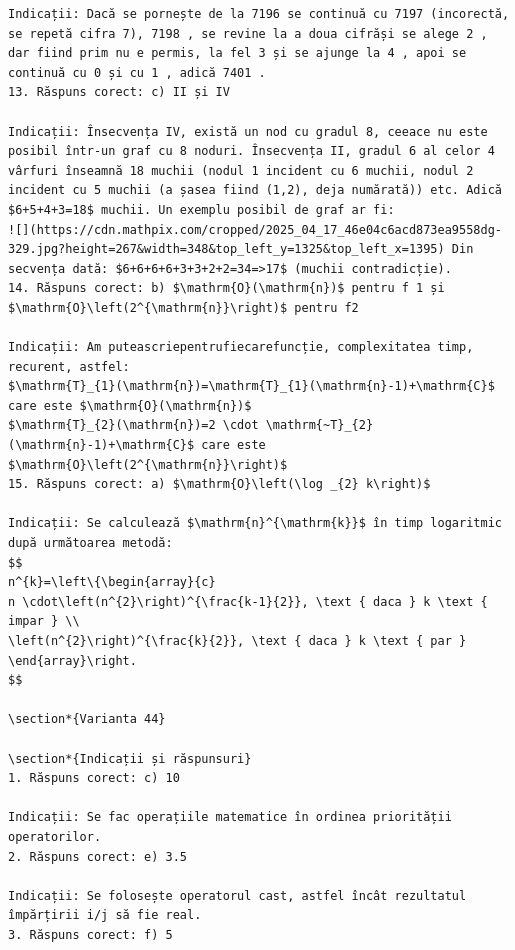 \documentclass[10pt]{article}
\begin{document}
\begin{verbatim}
Indicații: Dacă se pornește de la 7196 se continuă cu 7197 (incorectă, se repetă cifra 7), 7198 , se revine la a doua cifrăși se alege 2 , dar fiind prim nu e permis, la fel 3 și se ajunge la 4 , apoi se continuă cu 0 și cu 1 , adică 7401 .
13. Răspuns corect: c) II și IV

Indicații: Însecvența IV, există un nod cu gradul 8, ceeace nu este posibil într-un graf cu 8 noduri. Însecvența II, gradul 6 al celor 4 vârfuri înseamnă 18 muchii (nodul 1 incident cu 6 muchii, nodul 2 incident cu 5 muchii (a șasea fiind (1,2), deja numărată)) etc. Adică
$6+5+4+3=18$ muchii. Un exemplu posibil de graf ar fi:
![](https://cdn.mathpix.com/cropped/2025_04_17_46e04c6acd873ea9558dg-329.jpg?height=267&width=348&top_left_y=1325&top_left_x=1395) Din secvența dată: $6+6+6+6+3+3+2+2=34=>17$ (muchii contradicție).
14. Răspuns corect: b) $\mathrm{O}(\mathrm{n})$ pentru f 1 și $\mathrm{O}\left(2^{\mathrm{n}}\right)$ pentru f2

Indicații: Am puteascriepentrufiecarefuncție, complexitatea timp, recurent, astfel:
$\mathrm{T}_{1}(\mathrm{n})=\mathrm{T}_{1}(\mathrm{n}-1)+\mathrm{C}$ care este $\mathrm{O}(\mathrm{n})$
$\mathrm{T}_{2}(\mathrm{n})=2 \cdot \mathrm{~T}_{2}(\mathrm{n}-1)+\mathrm{C}$ care este $\mathrm{O}\left(2^{\mathrm{n}}\right)$
15. Răspuns corect: a) $\mathrm{O}\left(\log _{2} k\right)$

Indicații: Se calculează $\mathrm{n}^{\mathrm{k}}$ în timp logaritmic după următoarea metodă:
$$
n^{k}=\left\{\begin{array}{c}
n \cdot\left(n^{2}\right)^{\frac{k-1}{2}}, \text { daca } k \text { impar } \\
\left(n^{2}\right)^{\frac{k}{2}}, \text { daca } k \text { par }
\end{array}\right.
$$

\section*{Varianta 44}

\section*{Indicații și răspunsuri}
1. Răspuns corect: c) 10

Indicații: Se fac operațiile matematice în ordinea priorității operatorilor.
2. Răspuns corect: e) 3.5

Indicații: Se folosește operatorul cast, astfel încât rezultatul împărțirii i/j să fie real.
3. Răspuns corect: f) 5


\end{verbatim}
\end{document}
